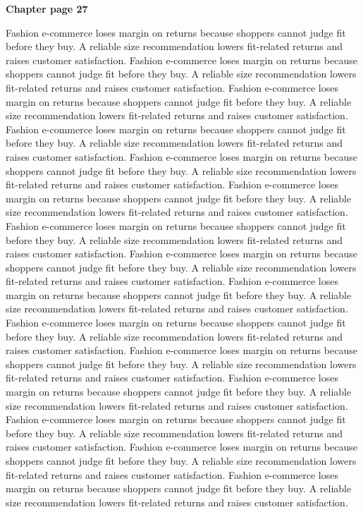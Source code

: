 \documentclass[a4paper,11pt]{article}
\begin{document}
{\headfont\bfseries\Large Chapter page 27}\par\medskip
Fashion e-commerce loses margin on returns because shoppers cannot judge fit before they buy. A reliable size recommendation lowers fit-related returns and raises customer satisfaction. Fashion e-commerce loses margin on returns because shoppers cannot judge fit before they buy. A reliable size recommendation lowers fit-related returns and raises customer satisfaction. Fashion e-commerce loses margin on returns because shoppers cannot judge fit before they buy. A reliable size recommendation lowers fit-related returns and raises customer satisfaction. Fashion e-commerce loses margin on returns because shoppers cannot judge fit before they buy. A reliable size recommendation lowers fit-related returns and raises customer satisfaction. Fashion e-commerce loses margin on returns because shoppers cannot judge fit before they buy. A reliable size recommendation lowers fit-related returns and raises customer satisfaction. 
Fashion e-commerce loses margin on returns because shoppers cannot judge fit before they buy. A reliable size recommendation lowers fit-related returns and raises customer satisfaction. Fashion e-commerce loses margin on returns because shoppers cannot judge fit before they buy. A reliable size recommendation lowers fit-related returns and raises customer satisfaction. Fashion e-commerce loses margin on returns because shoppers cannot judge fit before they buy. A reliable size recommendation lowers fit-related returns and raises customer satisfaction. Fashion e-commerce loses margin on returns because shoppers cannot judge fit before they buy. A reliable size recommendation lowers fit-related returns and raises customer satisfaction. Fashion e-commerce loses margin on returns because shoppers cannot judge fit before they buy. A reliable size recommendation lowers fit-related returns and raises customer satisfaction. 
Fashion e-commerce loses margin on returns because shoppers cannot judge fit before they buy. A reliable size recommendation lowers fit-related returns and raises customer satisfaction. Fashion e-commerce loses margin on returns because shoppers cannot judge fit before they buy. A reliable size recommendation lowers fit-related returns and raises customer satisfaction. Fashion e-commerce loses margin on returns because shoppers cannot judge fit before they buy. A reliable size recommendation lowers fit-related returns and raises customer satisfaction. Fashion e-commerce loses margin on returns because shoppers cannot judge fit before they buy. A reliable size recommendation lowers fit-related returns and raises customer satisfaction. Fashion e-commerce loses margin on returns because shoppers cannot judge fit before they buy. A reliable size recommendation lowers fit-related returns and raises customer satisfaction. \newpage
\end{document}
